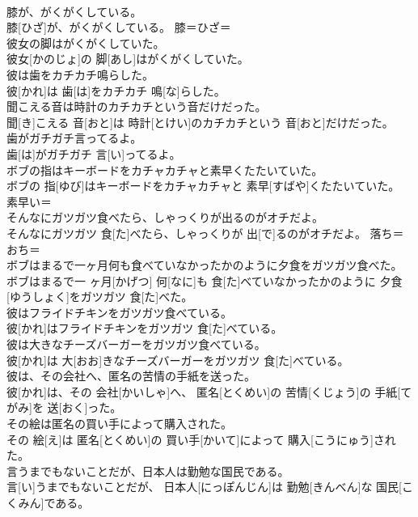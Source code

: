 \documentclass[8pt]{extreport}
\begin{document}
\begin{CJK}{UTF8}{min}
\\	膝が、がくがくしている。	
\\	膝[ひざ]が、がくがくしている。	膝＝ひざ＝ 
\\	彼女の脚はがくがくしていた。	
\\	彼女[かのじょ]の 脚[あし]はがくがくしていた。	
\\	彼は歯をカチカチ鳴らした。	
\\	彼[かれ]は 歯[は]をカチカチ 鳴[な]らした。	
\\	聞こえる音は時計のカチカチという音だけだった。	
\\	聞[き]こえる 音[おと]は 時計[とけい]のカチカチという 音[おと]だけだった。	
\\	歯がガチガチ言ってるよ。	
\\	歯[は]がガチガチ 言[い]ってるよ。	
\\	ボブの指はキーボードをカチャカチャと素早くたたいていた。	
\\	ボブの 指[ゆび]はキーボードをカチャカチャと 素早[すばや]くたたいていた。	素早い＝ 
\\	そんなにガツガツ食べたら、しゃっくりが出るのがオチだよ。	
\\	そんなにガツガツ 食[た]べたら、しゃっくりが 出[で]るのがオチだよ。	落ち＝おち＝ 
\\	ボブはまるで一ヶ月何も食べていなかったかのように夕食をガツガツ食べた。	
\\	ボブはまるで一 ヶ月[かげつ] 何[なに]も 食[た]べていなかったかのように 夕食[ゆうしょく]をガツガツ 食[た]べた。	
\\	彼はフライドチキンをガツガツ食べている。	
\\	彼[かれ]はフライドチキンをガツガツ 食[た]べている。	
\\	彼は大きなチーズバーガーをガツガツ食べている。	
\\	彼[かれ]は 大[おお]きなチーズバーガーをガツガツ 食[た]べている。	
\\	彼は、その会社へ、匿名の苦情の手紙を送った。	
\\	彼[かれ]は、その 会社[かいしゃ]へ、 匿名[とくめい]の 苦情[くじょう]の 手紙[てがみ]を 送[おく]った。	
\\	その絵は匿名の買い手によって購入された。	
\\	その 絵[え]は 匿名[とくめい]の 買い手[かいて]によって 購入[こうにゅう]された。	
\\	言うまでもないことだが、日本人は勤勉な国民である。	
\\	言[い]うまでもないことだが、 日本人[にっぽんじん]は 勤勉[きんべん]な 国民[こくみん]である。	

\end{CJK}
\end{document}
